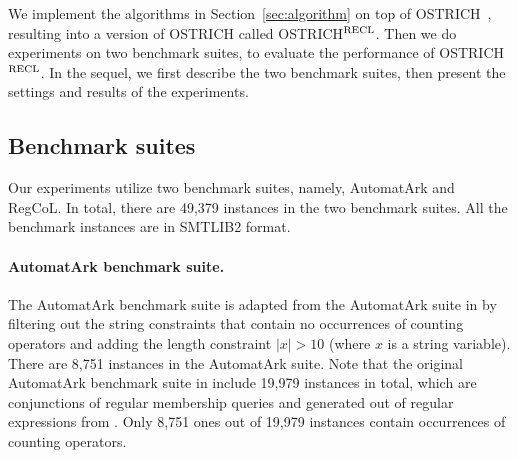 %

We implement the algorithms in Section~\ref{sec:algorithm} on top of OSTRICH~\cite{ostrich,atva2020}, resulting into a version of OSTRICH called OSTRICH$^{\rm RECL}$.
Then we do experiments on two benchmark suites, to evaluate the performance of OSTRICH$^{\rm RECL}$.  In the sequel, we first describe the two benchmark suites, then present the settings and results of the experiments. 


\subsection{Benchmark suites}

Our experiments utilize two benchmark suites, namely, AutomatArk and RegCoL. In total, there are 49,379 instances in the two benchmark suites. All the benchmark instances are in SMTLIB2 format. 

\paragraph*{AutomatArk benchmark suite.}
The AutomatArk benchmark suite is adapted from the AutomatArk suite in \cite{z3str3re} by filtering out the string constraints that contain no occurrences of counting operators and adding the length constraint $|x| > 10$ (where $x$ is a string variable). There are 8,751 instances in the AutomatArk suite.
Note that the original AutomatArk benchmark suite in \cite{z3str3re} include 19,979 instances in total, which are conjunctions of regular membership queries and generated out of regular expressions from \cite{automatark}. Only 8,751 ones out of 19,979 instances contain occurrences of counting operators. 

